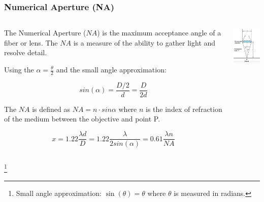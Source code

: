 \documentclass{beamer}
\begin{document}
\begin{frame}\frametitle{Numerical Aperture (NA)}
\begin{columns}
\begin{column}{8cm}
The Numerical Aperture ($NA$) is the maximum acceptance angle of a fiber or lens. The $NA$ is a measure of the ability to gather light and resolve detail.

Using the $\alpha = \frac{\theta}{2}$ and the small angle approximation:

\[ sin(\alpha) = \frac{D/2}{d} = \frac{D}{2d} \]

The $NA$ is defined as $NA = n \cdot sin{\alpha}$ where $n$ is the index of refraction of the medium between the objective and point P.

\[ x = 1.22\frac{\lambda d}{D} = 1.22 \frac{\lambda}{2 sin(\alpha)} = 0.61 \frac{\lambda n}{NA}\]

\end{column}
\begin{column}{3cm}
\begin{center}
\includegraphics[width=3cm]{fig/rayleigh3.jpg}
\end{center}
\end{column}

\end{columns}

\footnote{Small angle approximation: $\sin(\theta) = \theta$ where $\theta$ is measured in radians.}

\end{frame}
\end{document}
